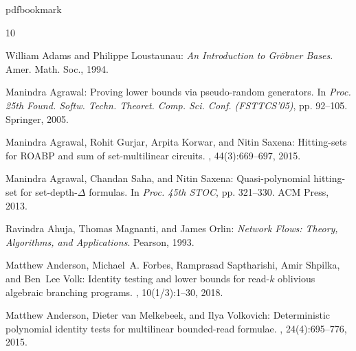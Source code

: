 \newcommand{\prelim}{Preliminary version in\ }\newcommand{\prelims}{Preliminary
  versions in\ }
\providecommand{\bibhead}[1]{}
\expandafter\ifx\csname pdfbookmark\endcsname\relax%
  \providecommand{\tocrefpdfbookmark}{}
\else\providecommand{\tocrefpdfbookmark}{%
   \hypertarget{tocreferences}{}%
   \pdfbookmark[1]{References}{tocreferences}}%
\fi

\tocrefpdfbookmark
\begin{thebibliography}{10}

\bibhead{AL1994}
{\sc William Adams and Philippe Loustaunau}: {\em An Introduction to
  Gr\"{o}bner Bases}.
\newblock Amer. Math. Soc., 1994.

\bibhead{Agrawal2005}
{\sc Manindra Agrawal}: Proving lower bounds via pseudo-random generators.
\newblock In {\em Proc. 25th Found. Softw. Techn. Theoret. Comp. Sci. Conf.
  (FSTTCS'05)}, pp. 92--105. Springer, 2005.
\newblock [\epfmtdoi{10.1007/11590156\_6}]

\bibhead{AGKS2014}
{\sc Manindra Agrawal, Rohit Gurjar, Arpita Korwar, and Nitin Saxena}:
  Hitting-sets for {ROABP} and sum of set-multilinear circuits.
, 44(3):669--697, 2015.
\newblock [\epfmtdoi{10.1137/140975103}]

\bibhead{ASS2013}
{\sc Manindra Agrawal, Chandan Saha, and Nitin Saxena}: Quasi-polynomial
  hitting-set for set-depth-{$\Delta$} formulas.
\newblock In {\em Proc. 45th STOC}, pp. 321--330. ACM Press, 2013.
\newblock [\epfmtdoi{10.1145/2488608.2488649}]

\bibhead{AMO93}
{\sc Ravindra Ahuja, Thomas Magnanti, and James Orlin}: {\em Network Flows:
  Theory, Algorithms, and Applications}.
\newblock Pearson, 1993.
\newblock [\epfmtdoi{10.5555/137406}]

\bibhead{AFSSV2015}
{\sc Matthew Anderson, Michael~A. Forbes, Ramprasad Saptharishi, Amir Shpilka,
  and Ben~Lee Volk}: Identity testing and lower bounds for read-$k$ oblivious
  algebraic branching programs.
, 10(1/3):1--30, 2018.
\newblock [\epfmtdoi{10.1145/3170709}]

\bibhead{AvMV2011}
{\sc Matthew Anderson, Dieter van Melkebeek, and Ilya Volkovich}: Deterministic
  polynomial identity tests for multilinear bounded-read formulae.
, 24(4):695--776, 2015.
\newblock [\epfmtdoi{10.1007/s00037-015-0097-4}]


\end{thebibliography}
